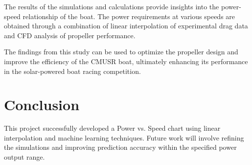 \documentclass{article}
\begin{document}
The results of the simulations and calculations provide insights into the power-speed relationship of the boat. The power requirements at various speeds are obtained through a combination of linear interpolation of experimental drag data and CFD analysis of propeller performance.

The findings from this study can be used to optimize the propeller design and improve the efficiency of the CMUSR boat, ultimately enhancing its performance in the solar-powered boat racing competition.

\section{Conclusion}
This project successfully developed a Power vs. Speed chart using linear interpolation and machine learning techniques. Future work will involve refining the simulations and improving prediction accuracy within the specified power output range.

\end{document}
